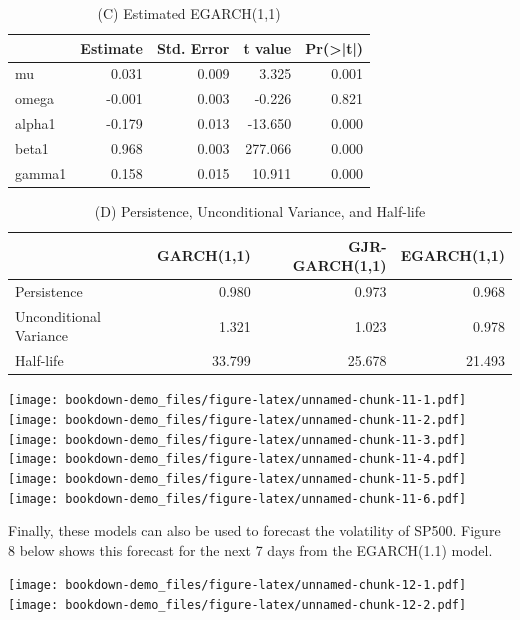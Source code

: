 \documentclass[]{book}
\theoremstyle{definition}
\theoremstyle{definition}
\theoremstyle{definition}
\theoremstyle{remark}
\begin{document}
\begin{table}[t]

\caption{\label{tab:unnamed-chunk-11}(C) Estimated EGARCH(1,1)}
\centering
\begin{tabular}{l|r|r|r|r}
\hline
  &  Estimate &  Std. Error &  t value & Pr(>|t|)\\
\hline
mu & 0.031 & 0.009 & 3.325 & 0.001\\
\hline
omega & -0.001 & 0.003 & -0.226 & 0.821\\
\hline
alpha1 & -0.179 & 0.013 & -13.650 & 0.000\\
\hline
beta1 & 0.968 & 0.003 & 277.066 & 0.000\\
\hline
gamma1 & 0.158 & 0.015 & 10.911 & 0.000\\
\hline
\end{tabular}
\end{table}

\begin{table}[t]

\caption{\label{tab:unnamed-chunk-11}(D) Persistence, Unconditional Variance, and Half-life}
\centering
\begin{tabular}{l|r|r|r}
\hline
  & GARCH(1,1) & GJR-GARCH(1,1) & EGARCH(1,1)\\
\hline
Persistence & 0.980 & 0.973 & 0.968\\
\hline
Unconditional Variance & 1.321 & 1.023 & 0.978\\
\hline
Half-life & 33.799 & 25.678 & 21.493\\
\hline
\end{tabular}
\end{table}

\texttt{[image: bookdown-demo\_files/figure-latex/unnamed-chunk-11-1.pdf]} \texttt{[image: bookdown-demo\_files/figure-latex/unnamed-chunk-11-2.pdf]} \texttt{[image: bookdown-demo\_files/figure-latex/unnamed-chunk-11-3.pdf]} \texttt{[image: bookdown-demo\_files/figure-latex/unnamed-chunk-11-4.pdf]} \texttt{[image: bookdown-demo\_files/figure-latex/unnamed-chunk-11-5.pdf]} \texttt{[image: bookdown-demo\_files/figure-latex/unnamed-chunk-11-6.pdf]}

Finally, these models can also be used to forecast the volatility of SP500. Figure 8 below shows this forecast for the next 7 days from the EGARCH(1.1) model.

\texttt{[image: bookdown-demo\_files/figure-latex/unnamed-chunk-12-1.pdf]} \texttt{[image: bookdown-demo\_files/figure-latex/unnamed-chunk-12-2.pdf]}


\end{document}

